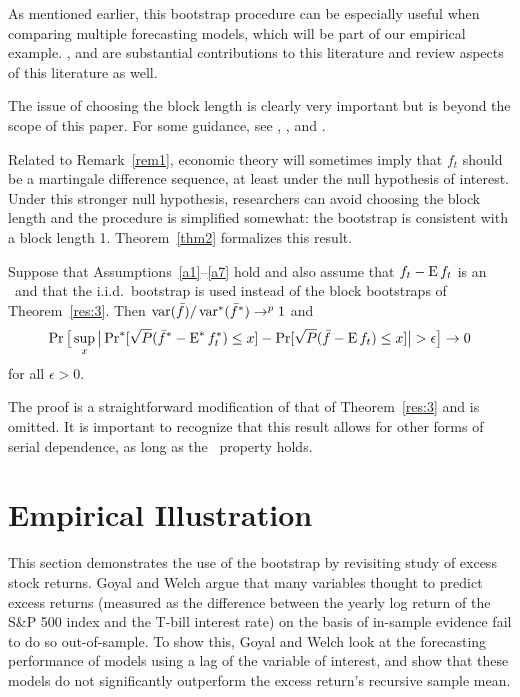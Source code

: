 \documentclass[12pt,fleqn]{article}
\begin{document}
\begin{rem}
  As mentioned earlier, this bootstrap procedure can be especially
  useful when comparing multiple forecasting models, which will be
  part of our empirical example. \cite{Whi:00}, \cite{Han:05} and
  \cite{RoW:05} are substantial contributions to this literature and
  \cite{RSW:08} review aspects of this literature as well.
\end{rem}

\begin{rem}\label{rem1}
  The issue of choosing the block length is clearly very important but
  is beyond the scope of this paper. For some guidance, see
  \cite{PoW:04}, \cite{RoW:06}, and \cite{PPW:09}.
\end{rem}

Related to Remark~\ref{rem1}, economic theory will sometimes imply
that $f_t$ should be a martingale difference sequence, at least under
the null hypothesis of interest. Under this stronger null hypothesis,
researchers can avoid choosing the block length and the procedure is
simplified somewhat: the bootstrap is consistent with a block length 1.
Theorem~\ref{thm2} formalizes this result.

\begin{thm}\label{thm2}
  Suppose that Assumptions~\ref{a1}--\ref{a7} hold and also assume
  that $f_t - \operatorname{E} f_t$ is an \mds\ and that the i.i.d.\ bootstrap is
  used instead of the block bootstraps of Theorem~\ref{res:3}. Then
  $\operatorname{var}(\bar f)/\operatorname{var}^*(\bar f^*) \to^p 1$
  and
  \begin{equation}\label{eq:20}
    \operatorname{Pr}\big[\sup_x \big\lvert \operatorname{Pr}^*[\sqrt{P} (\bar f^* - \operatorname{E}^* f_t^*) \leq x]
    - \operatorname{Pr}[\sqrt{P}( \bar{f} - \operatorname{E} f_t) \leq x] \big\rvert > \epsilon\big] \to 0
  \end{equation}
  for all $\epsilon > 0$.
\end{thm}

The proof is a straightforward modification of that of
Theorem~\ref{res:3} and is omitted. It is important to recognize that
this result allows for other forms of serial dependence, as long as
the \mds\ property holds.

\section{Empirical Illustration}\label{sec:3}

This section demonstrates the use of the bootstrap by revisiting
 study of excess stock returns. Goyal and Welch argue
that many variables thought to predict excess returns (measured as the
difference between the yearly log return of the S\&P 500 index and the
T-bill interest rate) on the basis of in-sample evidence fail to do so
out-of-sample.  To show this, Goyal and Welch look at the forecasting
performance of models using a lag of the variable of interest, and
show that these models do not significantly outperform the excess
return's recursive sample mean.
\end{document}
